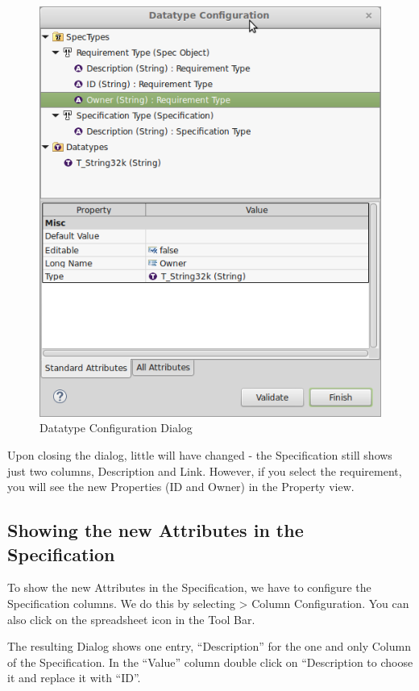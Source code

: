 \begin{figure}[h!]
\centering
\includegraphics[width=0.8\linewidth]{../rmf-images/datatype.png}
\caption{Datatype Configuration Dialog}
\label{fig:datatype_configuration}
\end{figure}

Upon closing the dialog, little will have changed - the Specification still shows just two columns, Description and Link.  However, if you select the requirement, you will see the new Properties (ID and Owner) in the Property view.

\subsection{Showing the new Attributes in the Specification}

To show the new Attributes in the Specification, we have to configure the Specification columns.  We do this by selecting \pror{} \textgreater{} Column Configuration.  You can also click on the spreadsheet icon in the Tool Bar.

The resulting Dialog shows one entry, ``Description'' for the one and only Column of the Specification.  In the ``Value'' column double click on ``Description to choose it and replace it with ``ID''.

